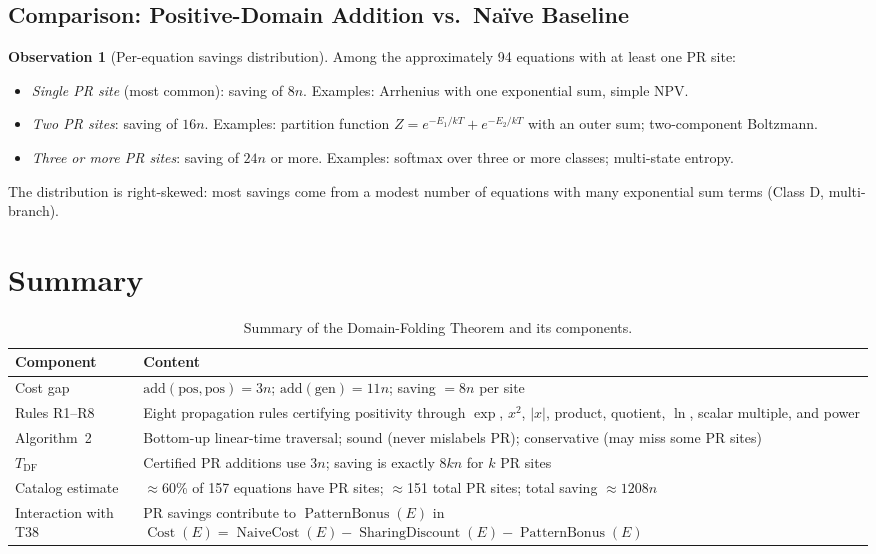 \documentclass[12pt,a4paper]{article}
\theoremstyle{definition}
\newtheorem{observation}[theorem]{Observation}
\newcommand{\Cost}{\operatorname{Cost}}
\newcommand{\NC}{\operatorname{NaiveCost}}
\newcommand{\SD}{\operatorname{SharingDiscount}}
\newcommand{\PB}{\operatorname{PatternBonus}}
\begin{document}
\subsection{Comparison: Positive-Domain Addition vs.\ Na\"{i}ve Baseline}

\begin{observation}[Per-equation savings distribution]
\label{obs:per-eq}
Among the approximately 94 equations with at least one PR site:
\begin{itemize}
  \item \emph{Single PR site} (most common): saving of $8n$.
        Examples: Arrhenius with one exponential sum, simple NPV.
  \item \emph{Two PR sites}: saving of $16n$.
        Examples: partition function $Z = e^{-E_1/kT} + e^{-E_2/kT}$ with an
        outer sum; two-component Boltzmann.
  \item \emph{Three or more PR sites}: saving of $24n$ or more.
        Examples: softmax over three or more classes; multi-state entropy.
\end{itemize}
The distribution is right-skewed: most savings come from a modest number of
equations with many exponential sum terms (Class D, multi-branch).
\end{observation}

\section*{Summary}

\begin{table}[h]
\centering
\caption{Summary of the Domain-Folding Theorem and its components.}
\label{tab:summary}
\smallskip
\begin{tabular}{@{}L{3.8cm}L{9.5cm}@{}}
\toprule
\textbf{Component} & \textbf{Content} \\
\midrule
Cost gap
  & $\mathrm{add}(\mathrm{pos},\mathrm{pos}) = 3n$;
    $\mathrm{add}(\mathrm{gen}) = 11n$;
    saving $= 8n$ per site \\[4pt]
Rules R1--R8
  & Eight propagation rules certifying positivity through $\exp$, $x^2$,
    $|x|$, product, quotient, $\ln$, scalar multiple, and power \\[4pt]
Algorithm~2
  & Bottom-up linear-time traversal; sound (never mislabels PR);
    conservative (may miss some PR sites) \\[4pt]
$T_{\mathrm{DF}}$
  & Certified PR additions use $3n$; saving is exactly $8kn$ for $k$ PR sites \\[4pt]
Catalog estimate
  & $\approx$60\% of 157 equations have PR sites; $\approx$151 total PR sites;
    total saving $\approx 1208n$ \\[4pt]
Interaction with T38
  & PR savings contribute to $\PB(E)$ in
    $\Cost(E) = \NC(E) - \SD(E) - \PB(E)$ \\
\bottomrule
\end{tabular}
\end{table}
\end{document}

